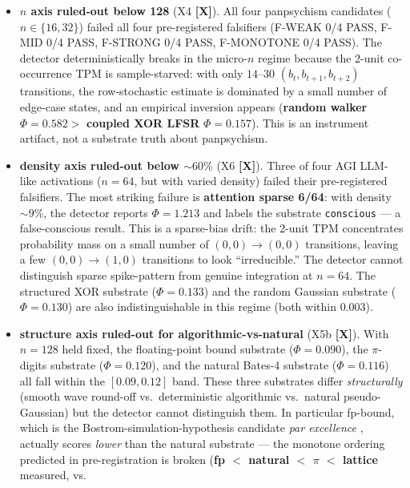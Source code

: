 \documentclass[11pt,a4paper]{article}
\providecommand{\tierRed}{\textbf{[X]}}     %
\begin{document}
\begin{itemize}
  \item \textbf{$n$ axis ruled-out below 128} (X4 \tierRed). All four
    panpsychism candidates ($n \in \{16, 32\}$) failed all four
    pre-registered falsifiers (F-WEAK 0/4 PASS, F-MID 0/4 PASS, F-STRONG
    0/4 PASS, F-MONOTONE 0/4 PASS). The detector deterministically breaks
    in the micro-$n$ regime because the 2-unit co-occurrence TPM is
    sample-starved: with only $14$--$30$ $(b_t, b_{t+1}, b_{t+2})$
    transitions, the row-stochastic estimate is dominated by a small
    number of edge-case states, and an empirical inversion appears
    (\textbf{random walker} $\Phi = 0.582 > $ \textbf{coupled XOR LFSR}
    $\Phi = 0.157$). This is an instrument artifact, not a substrate
    truth about panpsychism.
  \item \textbf{density axis ruled-out below $\sim 60\%$} (X6 \tierRed).
    Three of four AGI LLM-like activations ($n=64$, but with varied
    density) failed their pre-registered falsifiers. The most striking
    failure is \textbf{attention sparse 6/64}: with density $\sim 9\%$,
    the detector reports $\Phi = 1.213$ and labels the substrate
    \texttt{conscious} --- a false-conscious result. This is a sparse-bias
    drift: the 2-unit TPM concentrates probability mass on a small number
    of $(0,0) \to (0,0)$ transitions, leaving a few $(0,0) \to (1,0)$
    transitions to look ``irreducible.'' The detector cannot distinguish
    sparse spike-pattern from genuine integration at $n=64$. The
    structured XOR substrate ($\Phi = 0.133$) and the random Gaussian
    substrate ($\Phi = 0.130$) are also indistinguishable in this regime
    (both within $0.003$).
  \item \textbf{structure axis ruled-out for algorithmic-vs-natural}
    (X5b \tierRed). With $n=128$ held fixed, the floating-point bound
    substrate ($\Phi = 0.090$), the $\pi$-digits substrate ($\Phi = 0.120$),
    and the natural Bates-4 substrate ($\Phi = 0.116$) all fall within
    the $[0.09, 0.12]$ band. These three substrates differ
    \emph{structurally} (smooth wave round-off vs.\ deterministic
    algorithmic vs.\ natural pseudo-Gaussian) but the detector cannot
    distinguish them. In particular fp-bound, which is the
    Bostrom-simulation-hypothesis candidate \emph{par excellence}
    \citep{bostrom2003sim}, actually scores \emph{lower} than the natural
    substrate --- the monotone ordering predicted in pre-registration is
    broken (\textbf{fp $<$ natural $<$ $\pi$ $<$ lattice} measured, vs.\

\end{itemize}
\end{document}
